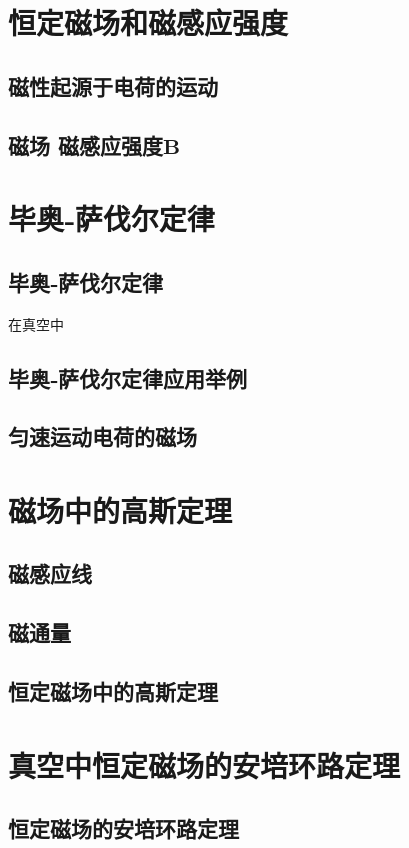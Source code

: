 \section{恒定磁场和磁感应强度}
    \subsection{磁性起源于电荷的运动}
    \subsection{磁场 磁感应强度$\boldsymbol{B}$}

\section{毕奥‑萨伐尔定律}
    \subsection{毕奥‑萨伐尔定律}
    在真空中
    \subsection{毕奥‑萨伐尔定律应用举例}
    \subsection{匀速运动电荷的磁场}

\section{磁场中的高斯定理}
    \subsection{磁感应线}
    \subsection{磁通量}
    \subsection{恒定磁场中的高斯定理}

\section{真空中恒定磁场的安培环路定理}
    \subsection{恒定磁场的安培环路定理}
